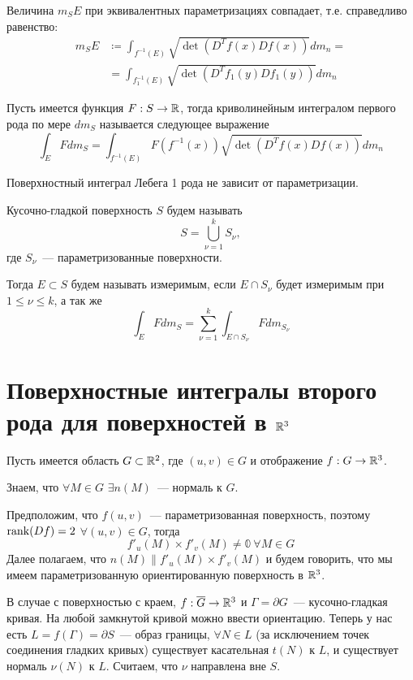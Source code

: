 \documentclass[main]{subfiles}
\begin{document}
\begin{theorem}
    Величина $m_S E$ при эквивалентных параметризациях совпадает, т.е. справедливо равенство:
    \begin{align*}
        m_S E & \coloneq \int_{f^{-1}(E)} \sqrt{\det(D^Tf(x) Df(x))} dm_n = \\
              & = \int_{f_1^{-1}(E)} \sqrt{\det(D^Tf_1(y) Df_1(y))} dm_n
    \end{align*}
\end{theorem}

\begin{definition}
    Пусть имеется функция $F: S \to \mathbb{R}$, тогда криволинейным интегралом первого рода по мере $dm_S$ называется следующее выражение
    \[\int_E F dm_S = \int_{f^{-1}(E)} F(f^{-1}(x)) \sqrt{\det(D^Tf(x) Df(x))} dm_n\]
\end{definition}
\begin{theorem}
    Поверхностный интеграл Лебега 1 рода не зависит от параметризации.
\end{theorem}

\begin{definition}
    Кусочно-гладкой поверхность $S$ будем называть
    \[S = \bigcup_{\nu = 1}^k S_\nu,\]
    где $S_\nu$~--- параметризованные поверхности.

    Тогда $E \subset S$ будем называть измеримым, если $E \cap S_\nu$ будет измеримым при $1 \le \nu \le k$, а так же
    \[\int_E F dm_S = \sum_{\nu = 1}^{k} \int_{E \cap S_\nu} F dm_{S_\nu}\]
\end{definition}

\section{Поверхностные интегралы второго рода для поверхностей в \texorpdfstring{$\mathbb{R}^3$}{R\textasciicircum 3}}
\begin{definition}
    Пусть имеется область $G \subset \mathbb{R}^2$, где $(u, v) \in G$ и отображение $f: G \to \mathbb{R}^3$.

    Знаем, что $\forall M \in G$ $\exists n(M)$~--- нормаль к $G$.

    Предположим, что $f(u, v)$~--- параметризованная поверхность, поэтому $\operatorname{rank}(Df) = 2$ $\forall (u, v) \in G$, тогда
    \[f'_u(M) \times f'_v(M) \neq \mathbb{0}\ \forall M \in G\]
    Далее полагаем, что $n(M) \parallel f'_u(M) \times f'_v(M)$ и будем говорить, что мы имеем параметризованную ориентированную поверхность в $\mathbb{R}^3$.
\end{definition}
В случае с поверхностью с краем, $f: \overline{G} \to \mathbb{R}^3$ и $\Gamma = \partial G$~--- кусочно-гладкая кривая.
На любой замкнутой кривой можно ввести ориентацию.
Теперь у нас есть $L = f(\Gamma) = \partial S$~--- образ границы, $\forall N \in L$ (за исключением точек соединения гладких кривых) существует касательная $t(N)$ к $L$, и существует нормаль $\nu(N)$ к $L$.
Считаем, что $\nu$ направлена вне $S$.
\end{document}
